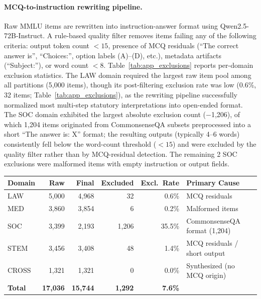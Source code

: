 \documentclass[a4paper,fleql]{cas-sc}
\begin{document}
\paragraph{MCQ-to-instruction rewriting pipeline.}
Raw MMLU items are rewritten into instruction-answer format using
Qwen2.5-72B-Instruct. A rule-based quality filter removes items failing
any of the following criteria: output token count $< 15$, presence of MCQ
residuals (``The correct answer is'', ``Choices:'', option labels
(A)--(D), etc.), metadata artifacts (``Subject:''), or word count $< 8$.
Table~\ref{tab:app_exclusions} reports per-domain exclusion statistics.
The LAW domain required the largest raw item pool among all partitions
(5,000 items), though its post-filtering exclusion rate was low (0.6\%,
32 items; Table~\ref{tab:app_exclusions}), as the rewriting pipeline
successfully normalized most multi-step statutory interpretations into
open-ended format. The SOC domain exhibited the largest absolute exclusion count
($-$1,206), of which 1,204 items originated from CommonsenseQA subsets
preprocessed into a short ``The answer is: X'' format; the resulting
outputs (typically 4--6 words) consistently fell below the word-count
threshold ($< 15$) and were excluded by the quality filter rather than by
MCQ-residual detection. The remaining 2 SOC exclusions were malformed items
with empty instruction or output fields.

\vspace{6pt plus 4pt minus 3pt}
\begin{center}
\begingroup
{}
\label{tab:app_exclusions}
\renewcommand{\arraystretch}{1.3}
\begin{tabular}{lrrrrl}
\toprule
\textbf{Domain} & \textbf{Raw} & \textbf{Final} & \textbf{Excluded}
  & \textbf{Excl.\ Rate} & \textbf{Primary Cause} \\
\midrule
LAW   & 5,000 & 4,968 &     32 &  0.6\% & MCQ residuals \\
MED   & 3,860 & 3,854 &      6 &  0.2\% & Malformed items \\
SOC   & 3,399 & 2,193 &  1,206 & 35.5\% & CommonsenseQA format (1,204) \\
STEM  & 3,456 & 3,408 &     48 &  1.4\% & MCQ residuals / short output \\
CROSS & 1,321 & 1,321 &      0 &  0.0\% & Synthesized (no MCQ origin) \\
\midrule
\textbf{Total}
  & \textbf{17,036} & \textbf{15,744} & \textbf{1,292}
  & \textbf{7.6\%} & \\
\bottomrule
\end{tabular}
\endgroup
\end{center}
\vspace{6pt plus 4pt minus 3pt}
\end{document}
